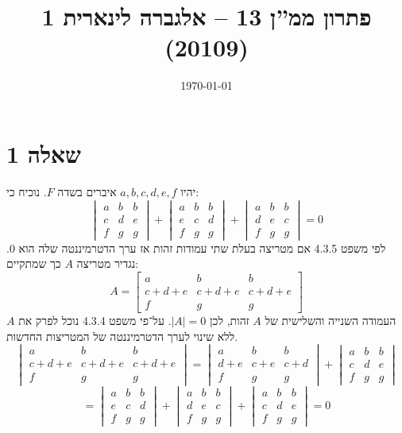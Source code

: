 \documentclass[a4paper,10pt]{article}
\title{פתרון ממ''ן 13 – אלגברה לינארית 1 (20109)}
\author{\AUTHOR}
\date\today
\begin{document}
\maketitle
\section{שאלה 1}
יהיו $a, b, c, d, e, f$ איברים בשדה $F$. נוכיח כי:
	\[ \begin{vmatrix}
		a & b & b \\
		c & d & e \\
		f & g & g
	\end{vmatrix}
	+
	\begin{vmatrix}
		a & b & b \\
		e & c & d \\
		f & g & g
	\end{vmatrix}
	+
	\begin{vmatrix}
		a & b & b \\
		d & e & c \\
		f & g & g
	\end{vmatrix}
	= 0
	\]
	לפי משפט 4.3.5 אם מטריצה בעלת שתי עמודות זהות אז ערך הדטרמיננטה שלה הוא 0.
	נגדיר מטריצה $A$ כך שמתקיים:
	\[ A =
	\begin{bmatrix}
		a & b & b \\
		c + d + e & c + d + e & c + d + e \\
		f & g & g
	\end{bmatrix}
	\]
	העמודה השנייה והשלישית של $A$ זהות, לכן $\vert A \vert = 0$.
	על־פי משפט 4.3.4 נוכל לפרק את $A$ ללא שינוי לערך הדטרמיננטה של המטריצות החדשות.
	\[
	\begin{vmatrix}
		a & b & b \\
		c + d + e & c + d + e & c + d + e \\
		f & g & g
	\end{vmatrix}
	=
	\begin{vmatrix}
		a & b & b \\
		d + e & c + e & c + d \\
		f & g & g
	\end{vmatrix}
	+
	\begin{vmatrix}
		a & b & b \\
		c & d & e \\
		f & g & g
	\end{vmatrix} \]\[
	= 
	\begin{vmatrix}
		a & b & b \\
		e & c & d \\
		f & g & g
	\end{vmatrix}
	+
	\begin{vmatrix}
		a & b & b \\
		d & e & c \\
		f & g & g
	\end{vmatrix}
	+
	\begin{vmatrix}
		a & b & b \\
		c & d & e \\
		f & g & g
	\end{vmatrix}
	= 0
	\]
\end{document}
